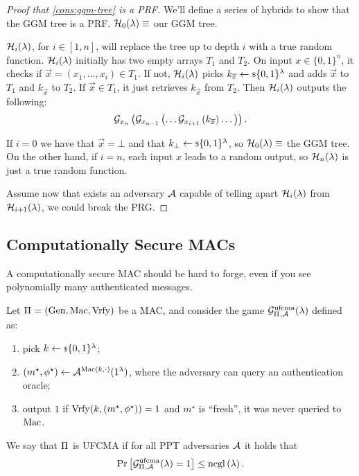 \begin{proof}[Proof that \cref{cons:ggm-tree} is a \acs{PRF}]
	We'll define a series of hybrids to show that the \ac{GGM} tree is a \ac{PRF}.
	$\mathcal{H}_0(\lambda) \equiv$ our \ac{GGM} tree.

	$\mathcal{H}_i(\lambda)$, for $i \in [1, n]$, will replace the tree up to depth $i$ with a true random function.
	$\mathcal{H}_i(\lambda)$ initially has two empty arrays $T_1$ and $T_2$.
	On input $x \in \{0,1\}^{n}$, it checks if $\vec{x} = (x_1, \dots, x_i) \in T_1$.
	If not, $\mathcal{H}_i(\lambda)$ picks $k_{\overline{x}} \leftarrow {\scriptstyle \$} {\{0,1\}^{\lambda}}$ and adds $\vec{x}$ to $T_1$ and $k_{\vec{x}}$ to $T_2$.
	If $\vec{x} \in T_1$, it just retrieves $k_{\vec{x}}$ from $T_2$.
	Then $\mathcal{H}_i(\lambda)$ outputs the following:
	\begin{equation*}
		\mathcal{G}_{x_n} \left( \mathcal{G}_{x_{n-1}} \left( \dots \mathcal{G}_{x_{i+1}} \left( k_{\overline{x}} \right) \dots \right) \right).
	\end{equation*}

	If $i = 0$ we have that $\vec{x} = \bot$ and that $k_{\bot} \leftarrow {\scriptstyle \$} {\{0,1\}^{\lambda}}$, so $\mathcal{H}_{0}(\lambda) \equiv$ the \ac{GGM} tree.
	On the other hand, if $i = n$, each input $x$ leads to a random output, so $\mathcal{H}_{n}(\lambda)$ is just a true random function.

	Assume now that exists an adversary $\mathcal{A}$ capable of telling apart $\mathcal{H}_{i}(\lambda)$ from $\mathcal{H}_{i+1}(\lambda)$, we could break the \ac{PRG}.
\end{proof}

\subsection{Computationally Secure \acsp{MAC}}

A computationally secure \ac{MAC} should be hard to forge, even if you see polynomially many authenticated messages.

\begin{definition}
	Let $\Pi_{} = \left( \mathrm{Gen}, \allowbreak \mathrm{Mac}, \allowbreak \mathrm{Vrfy} \right)$ be a \ac{MAC}, and consider the game $\mathcal{G}^{\scriptstyle \text{ufcma}}_{\Pi_{},\mathcal{A}}(\lambda)$ defined as:
	\begin{enumerate}
		\item pick $k \leftarrow {\scriptstyle \$} {\{0,1\}^{\lambda}}$;
		\item $(m^{\star}, \phi^{\star}) \leftarrow \mathcal{A}^{\mathrm{Mac}(k, \cdot)}(1^{\lambda})$, where the adversary can query an authentication oracle;
		\item output $1$ if $\mathrm{Vrfy}(k, (m^{\star}, \phi^{\star})) = 1$ and $m^{\star}$ is ``fresh'', \ie it was never queried to $\mathrm{Mac}$.
	\end{enumerate}
	We say that $\Pi_{}$ is \ac{UFCMA} if for all \ac{PPT} adversaries $\mathcal{A}$ it holds that
	\begin{equation*}
		\mathop{\mathrm{Pr}}\limits_{} \left[ {\mathcal{G}^{\scriptstyle \text{ufcma}}_{\Pi_{},\mathcal{A}} (\lambda) = 1} \right] \le \mathrm{negl}\left({\lambda}\right). \qedhere
	\end{equation*}
\end{definition}

